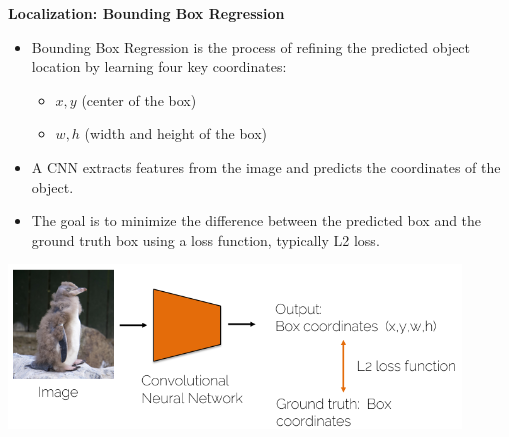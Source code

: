 \documentclass{beamer}
\begin{document}
\begin{frame}{\textbf{Localization: Bounding Box Regression}}
    \begin{itemize}
        \item Bounding Box Regression is the process of refining the predicted object location by learning four key coordinates: 
        \begin{itemize}
            \item \(x, y\) (center of the box)
            \item \(w, h\) (width and height of the box)
        \end{itemize}
        \item A CNN extracts features from the image and predicts the coordinates of the object.
        \item The goal is to minimize the difference between the predicted box and the ground truth box using a loss function, typically L2 loss.
    \end{itemize}
    
    \vfill
    \begin{center}
        \includegraphics[width=0.9\textwidth]{slide4.png}
    \end{center}
   
\end{frame}
\end{document}
